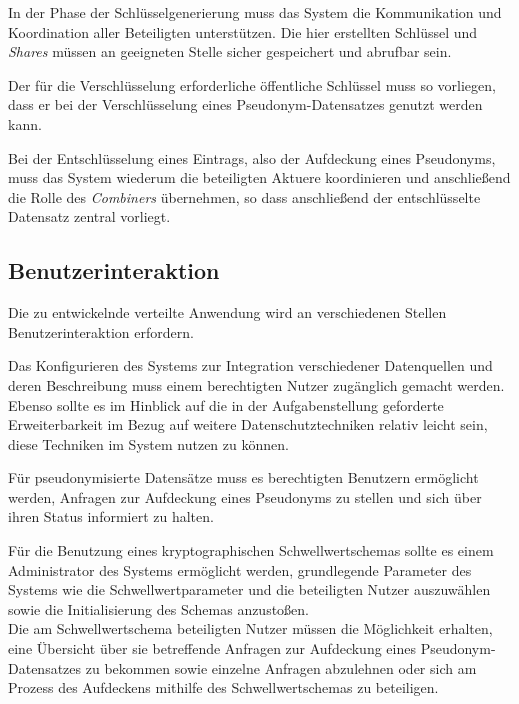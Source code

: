 In der Phase der Schlüsselgenerierung muss das System die Kommunikation und Koordination aller Beteiligten unterstützen. Die hier erstellten Schlüssel und \textit{Shares} müssen an geeigneten Stelle sicher gespeichert und abrufbar sein.

Der für die Verschlüsselung erforderliche öffentliche Schlüssel muss so vorliegen, dass er bei der Verschlüsselung eines Pseudonym-Datensatzes genutzt werden kann.

Bei der Entschlüsselung eines Eintrags, also der Aufdeckung eines Pseudonyms, muss das System wiederum die beteiligten Aktuere koordinieren und anschließend die Rolle des \textit{Combiners} übernehmen, so dass anschließend der entschlüsselte Datensatz zentral vorliegt.

\subsection{Benutzerinteraktion}

\label{subsec_impl_requirements_userinteraction}




Die zu entwickelnde verteilte Anwendung wird an verschiedenen Stellen Benutzerinteraktion erfordern.

Das Konfigurieren des Systems zur Integration verschiedener Datenquellen und deren Beschreibung muss einem berechtigten Nutzer zugänglich gemacht werden. Ebenso sollte es im Hinblick auf die in der Aufgabenstellung geforderte Erweiterbarkeit im Bezug auf weitere Datenschutztechniken relativ leicht sein, diese Techniken im System nutzen zu können. 

Für pseudonymisierte Datensätze muss es berechtigten Benutzern ermöglicht werden, Anfragen zur Aufdeckung eines Pseudonyms zu stellen und sich über ihren Status informiert zu halten.

Für die Benutzung eines kryptographischen Schwellwertschemas sollte es einem Administrator des Systems ermöglicht werden, grundlegende Parameter des Systems wie die Schwellwertparameter und die beteiligten Nutzer auszuwählen sowie die Initialisierung des Schemas anzustoßen. \\
Die am Schwellwertschema beteiligten Nutzer müssen die Möglichkeit erhalten, eine Übersicht über sie betreffende Anfragen zur Aufdeckung eines Pseudonym-Datensatzes zu bekommen sowie einzelne Anfragen abzulehnen oder sich am Prozess des Aufdeckens mithilfe des Schwellwertschemas zu beteiligen. 

